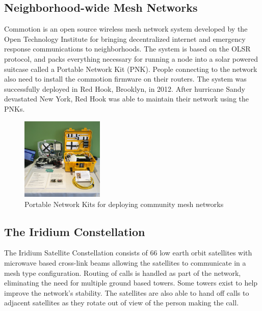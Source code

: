 \documentclass[conference]{IEEEtran}
\begin{document}
\subsection{Neighborhood-wide Mesh Networks}
Commotion is an open source wireless mesh network system developed by the Open Technology Institute for bringing decentralized internet and emergency response communications to neighborhoods. The system is based on the OLSR protocol\cite{enwiki:986340162}, and packs everything necessary for running a node into a solar powered suitcase called a Portable Network Kit (PNK). People connecting to 
the network also need to install the commotion firmware on their routers. The system was successfully deployed in Red Hook, Brooklyn, in 2012. After hurricane Sandy devastated New York, Red Hook was able to maintain their network using the PNKs\cite{byrum_2020}. 
\begin{figure}[h]
    \centering
    \includegraphics[width=0.35\textwidth]{pnk.jpg}
    \caption{Portable Network Kits for deploying community mesh networks}
\end{figure}
\subsection{The Iridium Constellation}
The Iridium Satellite Constellation consists of 66 low earth orbit satellites with microwave based cross-link beams allowing the satellites to communicate in a mesh type configuration.  Routing of calls is handled as part of the network, eliminating the need for multiple ground based towers. Some towers exist to help improve the network's stability. The satellites are also 
able to hand off calls to adjacent satellites as they rotate out of view of the person making the call. \cite{enwiki:1004659358}
\end{document}

